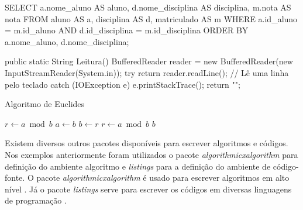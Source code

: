 %

\begin{codigo}[caption = {Consulta SQL}, label={codigo:notas_alunos},language=SQL, breaklines=true]
SELECT a.nome_aluno AS aluno,
       d.nome_disciplina AS disciplina,
       m.nota AS nota
FROM aluno AS a,
     disciplina AS d,
     matriculado AS m
WHERE a.id_aluno = m.id_aluno
  AND d.id_disciplina = m.id_disciplina
ORDER BY a.nome_aluno, d.nome_disciplina;
\end{codigo}

\begin{codigo}[caption={Subrotina para obter uma entrada do usuário}, label={codigo:metodo_leitura}, language=Java, breaklines=true]
public static String Leitura(){
    BufferedReader reader = new BufferedReader(new InputStreamReader(System.in));
    try {
        return reader.readLine(); // Lê uma linha pelo teclado
    } catch (IOException e) {
        e.printStackTrace();
        return "";
    }
}
\end{codigo}

\begin{algoritmo}
\caption{Algoritmo de Euclides}\label{algoritmo:euclidalgoritmo:mdc1}
\begin{algorithmic}[1]
\State $r\gets a\bmod b$
\State $a\gets b$
\State $b\gets r$
\State $r\gets a\bmod b$
\EndWhile\label{euclidendwhile}
\State \Return $b$
\EndProcedure
\end{algorithmic}
\end{algoritmo}

Existem diversos outros pacotes disponíveis para escrever algoritmos e códigos. Nos exemplos anteriormente foram utilizados o pacote \textit{algorithmicxalgorithm} para definição do ambiente algoritmo e \textit{listings} para a definição do ambiente de código-fonte. O pacote \textit{algorithmicxalgorithm} é usado para escrever algoritmos em alto nível \cite{janos:2005:algpseudocode}. Já o pacote \textit{listings} serve para escrever os códigos em diversas linguagens de programação \cite{moses:2006:listings}.

